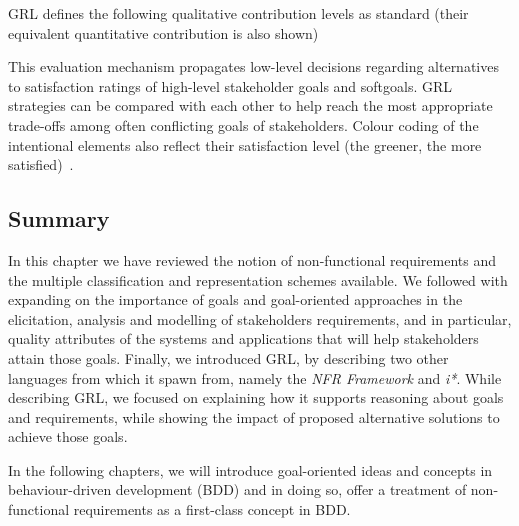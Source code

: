 \documentclass[dissertation,final]{softeng}
\newcommand{\nfrs}{non-functional requirements\xspace}
\begin{document}
{GRL defines the following qualitative contribution levels as standard (their equivalent quantitative contribution is also shown)
\begin{table}[h!]
\caption[GRL contribution levels in jUCMNav]{GRL contribution levels in jUCMNav}
\label{tb:grl_contribution_levels}
\setlength{\extrarowheight}{1.8pt}
\centering
{}
\end{table}

This evaluation mechanism propagates low-level decisions regarding alternatives to satisfaction ratings of high-level stakeholder goals and softgoals. GRL strategies can be compared with each other to help reach the most appropriate trade-offs among often conflicting goals of stakeholders. Colour coding of the intentional elements also reflect their satisfaction level (the greener, the more satisfied)~\citep{amyot2011user}.

\subsection{Summary}

In this chapter we have reviewed the notion of non-functional requirements and the multiple classification and representation schemes available. We followed with expanding on the importance of goals and goal-oriented approaches in the elicitation, analysis and modelling of stakeholders requirements, and in particular, quality attributes of the systems and applications that will help stakeholders attain those goals. Finally, we introduced GRL, by describing two other languages from which it spawn from, namely the \emph{NFR Framework} and \emph{i*}. While describing GRL, we focused on explaining how it supports reasoning about goals and requirements, while showing the impact of proposed alternative solutions to achieve those goals.

In the following chapters, we will introduce goal-oriented ideas and concepts in behaviour-driven development (BDD) and in doing so, offer a treatment of \nfrs as a first-class concept in BDD.

}
\end{document}
